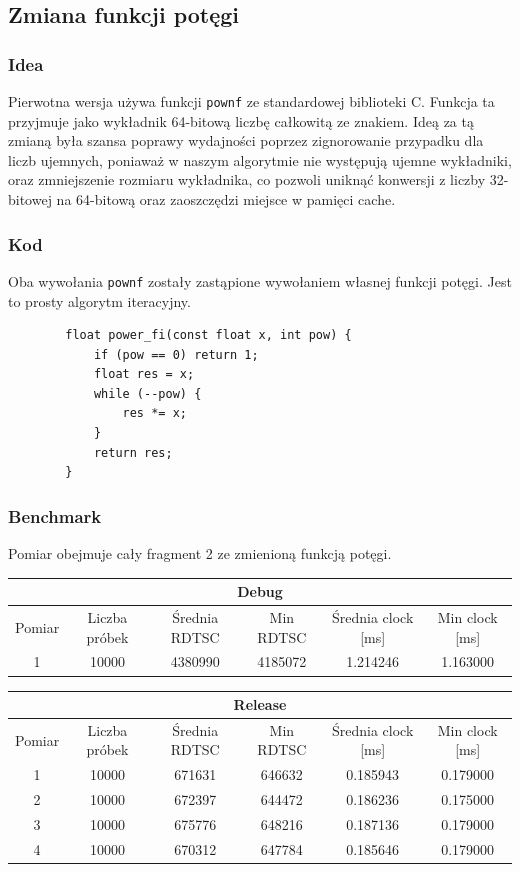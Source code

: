 \documentclass{article}
\begin{document}
	\subsection{Zmiana funkcji potęgi}
	\subsubsection{Idea}
	Pierwotna wersja używa funkcji \verb|pownf| ze standardowej biblioteki C. Funkcja ta przyjmuje jako wykładnik 64-bitową liczbę całkowitą ze znakiem. Ideą za tą zmianą była szansa poprawy wydajności poprzez zignorowanie przypadku dla liczb ujemnych, poniaważ w naszym algorytmie nie występują ujemne wykładniki, oraz zmniejszenie rozmiaru wykładnika, co pozwoli uniknąć konwersji z liczby 32-bitowej na 64-bitową oraz zaoszczędzi miejsce w pamięci cache.
	
	\subsubsection{Kod}
	Oba wywołania \verb|pownf| zostały zastąpione wywołaniem własnej funkcji potęgi. Jest to prosty algorytm iteracyjny.
	\begin{verbatim}
		float power_fi(const float x, int pow) {
			if (pow == 0) return 1;
			float res = x;
			while (--pow) {
				res *= x;
			}
			return res;
		}
	\end{verbatim}
	
	\subsubsection{Benchmark}
	Pomiar obejmuje cały fragment 2 ze zmienioną funkcją potęgi.
	\begin{center}
		\begin{tabular}{|c|c|c|c|c|c|} \hline
			\multicolumn{6}{|c|}{Debug} \\\hline
			Pomiar  & Liczba próbek & Średnia RDTSC & Min RDTSC & Średnia clock [ms] & Min clock [ms] \\\hline
			\hline
			1 & 10000 & 4380990 & 4185072 & 1.214246 & 1.163000 \\\hline
			
		\end{tabular}
	\end{center}
	\begin{center}
		\begin{tabular}{|c|c|c|c|c|c|} \hline
			\multicolumn{6}{|c|}{Release} \\\hline
			Pomiar  & Liczba próbek & Średnia RDTSC & Min RDTSC & Średnia clock [ms] & Min clock [ms] \\\hline
			\hline
			1 & 10000 & 671631 & 646632 & 0.185943 & 0.179000 \\\hline
			2 & 10000 & 672397 & 644472 & 0.186236 & 0.175000 \\\hline
			3 & 10000 & 675776 & 648216 & 0.187136 & 0.179000 \\\hline
			4 & 10000 & 670312 & 647784 & 0.185646 & 0.179000 \\\hline
			
		\end{tabular}
	\end{center}
	
\end{document}

